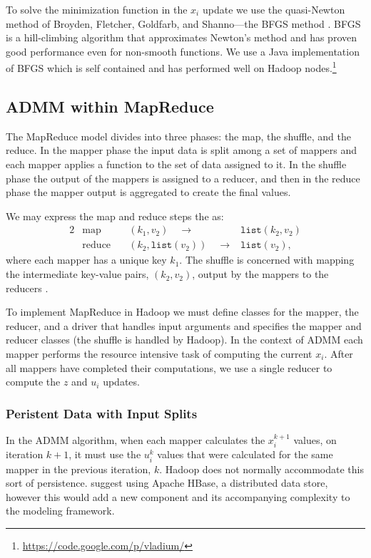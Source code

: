 \documentclass[10pt, conference, compsocconf]{IEEEtran}
\begin{document}
To solve the minimization function in the $x_i$ update we use the quasi-Newton method of Broyden, Fletcher, Goldfarb, and Shanno---the BFGS method \cite{bonnans2003numerical}.  BFGS is a hill-climbing algorithm that approximates Newton's method and has proven good performance even for non-smooth functions.  We use a Java implementation of BFGS which is self contained and has performed well on Hadoop nodes.\footnote{\url{https://code.google.com/p/vladium/}}

\subsection{ADMM within MapReduce}
The MapReduce model divides into three phases: the map, the shuffle, and the reduce.  In the mapper phase the input data is split among a set of mappers and each mapper applies a function to the set of data assigned to it.  In the shuffle phase the output of the mappers is assigned to a reducer, and then in the reduce phase the mapper output is aggregated to create the final values.

We may express the map and reduce steps the as:
\begin{alignat*}{2}
&\text{map}\quad &(k_1,v_2)\quad\rightarrow &\texttt{list}(k_2,v_2)\\
&\text{reduce}\quad &(k_2,\texttt{list}(v_2))\quad\rightarrow &\texttt{list}(v_2),
\end{alignat*}
where each mapper has a unique key $k_1$.  The shuffle is concerned with mapping the intermediate key-value pairs, $(k_2,v_2)$, output by the mappers to the reducers \cite{dean2004}.

To implement MapReduce in Hadoop we must define classes for the mapper, the reducer, and a driver that handles input arguments and specifies the mapper and reducer classes (the shuffle is handled by Hadoop).  In the context of ADMM each mapper performs the resource intensive task of computing the current $x_i$.  After all mappers have completed their computations, we use a single reducer to compute the $z$ and $u_i$ updates.

\subsubsection{Peristent Data with Input Splits}
In the ADMM algorithm, when each mapper calculates the $x_i^{k+1}$ values, on iteration $k+1$, it must use the $u_i^k$ values that were calculated for the same mapper in the previous iteration, $k$.  Hadoop does not normally accommodate this sort of persistence.  \cite{boyd} suggest using Apache HBase, a distributed data store, however this would add a new component and its accompanying complexity to the modeling framework.
\end{document}
